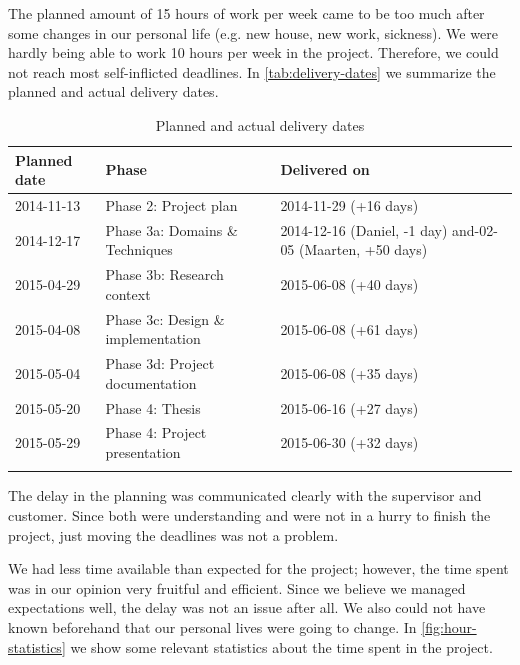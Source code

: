 The planned amount of 15 hours of work per week came to be too much after some changes in our personal life (e.g. new house, new work, sickness).
We were hardly being able to work 10 hours per week in the project.
Therefore, we could not reach most self-inflicted deadlines.
In \autoref{tab:delivery-dates} we summarize the planned and actual delivery dates.%
%
\begin{longtable}{|l|l|p{6cm}|}\hline
    \textbf{Planned date} & \textbf{Phase} & \textbf{Delivered on} \\\hline
	\endhead
    2014-11-13 & Phase 2: Project plan  & 2014-11-29 (+16 days)\\\hline
    2014-12-17 & Phase 3a: Domains \& Techniques  & 2014-12-16 (Daniel, -1 day) and\newline
                                                    2015-02-05 (Maarten, +50 days) \\\hline
    2015-04-29 & Phase 3b: Research context  & 2015-06-08 (+40 days) \\\hline
    2015-04-08 & Phase 3c: Design \& implementation  & 2015-06-08 (+61 days) \\\hline
    2015-05-04 & Phase 3d: Project documentation  & 2015-06-08 (+35 days) \\\hline
    2015-05-20 & Phase 4: Thesis  & 2015-06-16 (+27 days) \\\hline
    2015-05-29 & Phase 4: Project presentation  & 2015-06-30 (+32 days) \\\hline
  \caption{Planned and actual delivery dates}
  \label{tab:delivery-dates}
\end{longtable}%
%
The delay in the planning was communicated clearly with the supervisor and customer.
Since both were understanding and were not in a hurry to finish the project, just moving the deadlines was not a problem.

We had less time available than expected for the project; however, the time spent was in our opinion very fruitful and efficient.
Since we believe we managed expectations well, the delay was not an issue after all.
We also could not have known beforehand that our personal lives were going to change.
In \autoref{fig:hour-statistics} we show some relevant statistics about the time spent in the project.

